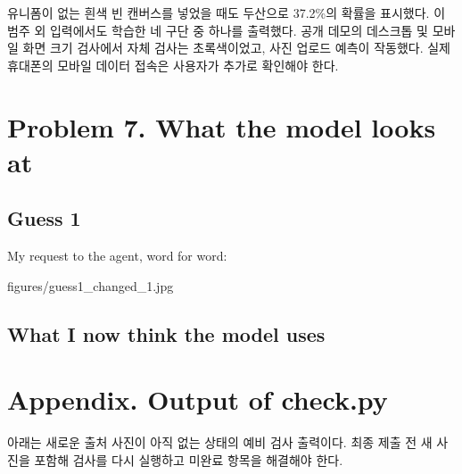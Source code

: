 \documentclass[11pt]{article}
\begin{document}
유니폼이 없는 흰색 빈 캔버스를 넣었을 때도 두산으로 37.2\%의 확률을 표시했다. 이 범주 외 입력에서도 학습한 네 구단 중 하나를 출력했다. 공개 데모의 데스크톱 및 모바일 화면 크기 검사에서 자체 검사는 초록색이었고, 사진 업로드 예측이 작동했다. 실제 휴대폰의 모바일 데이터 접속은 사용자가 추가로 확인해야 한다.

\section*{Problem 7. What the model looks at}

\subsection*{Guess 1}



My request to the agent, word for word:
\begin{quote}
\end{quote}

           {figures/guess1_changed_1.jpg}{}


\subsection*{What I now think the model uses}

\section*{Appendix. Output of check.py}
아래는 새로운 출처 사진이 아직 없는 상태의 예비 검사 출력이다. 최종 제출 전 새 사진을 포함해 검사를 다시 실행하고 미완료 항목을 해결해야 한다.

\end{document}
